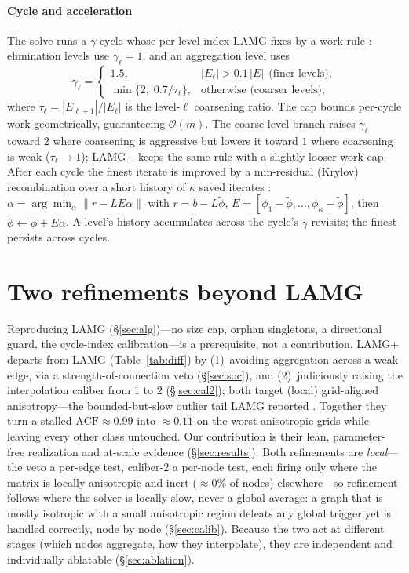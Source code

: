 \documentclass[review]{siamart220329}
\newcommand{\Om}{\mathcal{O}(m)}
\newcommand{\acf}{\mathrm{ACF}}
\begin{document}
\paragraph{Cycle and acceleration} The solve runs a $\gamma$-cycle whose per-level index
LAMG fixes by a work rule \cite[Eq.~4.1]{lamg}: elimination levels use $\gamma_\ell=1$, and an
aggregation level uses
\begin{equation}\label{eq:gamma}
\gamma_\ell=\begin{cases}1.5, & |E_\ell|>0.1\,|E|\ \ \text{(finer levels)},\\[2pt]
\min\{2,\;0.7/\tau_\ell\}, & \text{otherwise (coarser levels)},\end{cases}
\end{equation}
where $\tau_\ell=|E_{\ell+1}|/|E_\ell|$ is the level-$\ell$ coarsening ratio. The cap bounds
per-cycle work geometrically, guaranteeing $\Om$. The coarse-level branch raises $\gamma_\ell$
toward $2$ where coarsening is aggressive but lowers it toward $1$ where coarsening is weak
($\tau_\ell\to1$); LAMG+ keeps the same rule with a slightly looser work cap.
After each cycle the finest iterate is improved by a min-residual
(Krylov) recombination over a short history of $\kappa$ saved iterates \cite[\S7.8.2]{guide}:
$\alpha=\arg\min_\alpha\|r-LE\alpha\|$ with $r = b - L \tilde\phi$, $E=[\phi_1-\tilde\phi,\dots,\phi_{\kappa}-\tilde\phi]$, then
$\tilde\phi\leftarrow \tilde\phi+E\alpha$. A level's history accumulates across the cycle's $\gamma$
revisits; the finest persists across cycles.

\section{Two refinements beyond LAMG}\label{sec:choices}
Reproducing LAMG (\S\ref{sec:alg})---no size cap, orphan singletons, a directional guard, the
cycle-index calibration---is a prerequisite, not a contribution. LAMG+ departs
from LAMG (Table~\ref{tab:diff}) by (1)~avoiding aggregation across a weak edge, via a
strength-of-connection veto (\S\ref{sec:soc}), and (2)~judiciously raising the interpolation caliber
from $1$ to $2$ (\S\ref{sec:cal2}); both target (local) grid-aligned anisotropy---the bounded-but-slow
outlier tail LAMG reported \cite[\S\S5.2,\,6.1]{lamg}. Together they turn a stalled
$\acf\approx0.99$ into $\approx0.11$ on the worst anisotropic grids while leaving every other class
untouched. Our contribution is their lean, parameter-free realization and
at-scale evidence (\S\ref{sec:results}). Both refinements are \emph{local}---the veto a per-edge
test, caliber-2 a per-node test, each firing only where the matrix is locally anisotropic and inert
($\approx\!0\%$ of nodes) elsewhere---so refinement follows where the solver is locally slow, never a
global average: a graph that is mostly isotropic with a small anisotropic region defeats any global
trigger yet is handled correctly, node by node (\S\ref{sec:calib}). Because the two act at different
stages (which nodes aggregate, how they interpolate), they are independent and individually
ablatable (\S\ref{sec:ablation}).
\end{document}
